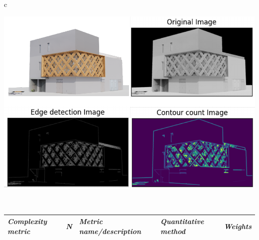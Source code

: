 \documentclass[final,5p,times]{elsarticle}%
\begin{document}
\begin{linenumbers}
\begin{table}[h!tb]
\begin{tabular}{c}
\begin{minipage}{\textwidth}
\begin{minipage}{0.49\textwidth}
                            \label{fig:ComplexityPlotHistory}
                        \end{minipage}
                        \hfill %
                        \begin{minipage}{0.49\textwidth}
                            \includegraphics[width= \linewidth]{Images/ComplexitPlotRenderCICA}
                            \label{fig:ComplexityPlotRenderCICA}
                        \end{minipage}
                    \end{minipage}
                    \\
                    \begin{minipage}{\textwidth}
                        \centering
                        \label{tab:MetricsandWeights}
                        \begin{tabularx}{\textwidth}{p{3.5cm} p{1cm} X X p{1cm}}
                            \toprule
                            \textit{Complexity metric} &
                              \textit{N} &
                              \textit{Metric name/description} &
                              \textit{Quantitative   method} &
                              \textit{Weights} \\ \midrule

\end{tabularx}
\end{minipage}
\end{tabular}
\end{table}
\end{linenumbers}
\end{document}
